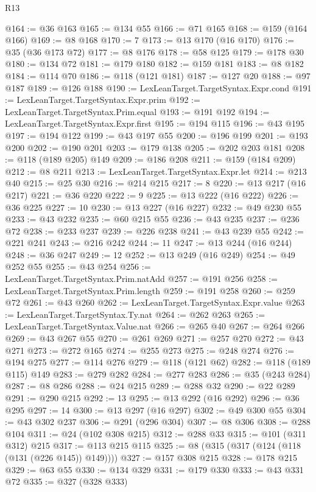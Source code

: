 \begin{lexlean}{R13}
\begin{coremodule}
@164 := @36 @163
@165 := @134 @55
@166 := @71 @165
@168 := @159 (@164 @166)
@169 := @8 @168
@170 := 7
@173 := @13 @170 (@16 @170)
@176 := @35 (@36 @173 @72)
@177 := @8 @176
@178 := @58 @125
@179 := @178 @30
@180 := @134 @72
@181 := @179 @180
@182 := @159 @181
@183 := @8 @182
@184 := @114 @70
@186 := @118 (@121 @181)
@187 := @127 @20
@188 := @97 @187
@189 := @126 @188
@190 := LexLeanTarget.TargetSyntax.Expr.cond
@191 := LexLeanTarget.TargetSyntax.Expr.prim
@192 := LexLeanTarget.TargetSyntax.Prim.equal
@193 := @191 @192
@194 := LexLeanTarget.TargetSyntax.Expr.first
@195 := @194 @115
@196 := @43 @195
@197 := @194 @122
@199 := @43 @197 @55
@200 := @196 @199
@201 := @193 @200
@202 := @190 @201
@203 := @179 @138
@205 := @202 @203 @181
@208 := @118 (@189 @205) @149
@209 := @186 @208
@211 := @159 (@184 @209)
@212 := @8 @211
@213 := LexLeanTarget.TargetSyntax.Expr.let
@214 := @213 @40
@215 := @25 @30
@216 := @214 @215
@217 := 8
@220 := @13 @217 (@16 @217)
@221 := @36 @220
@222 := 9
@225 := @13 @222 (@16 @222)
@226 := @36 @225
@227 := 10
@230 := @13 @227 (@16 @227)
@232 := @49 @230 @55
@233 := @43 @232
@235 := @60 @215 @55
@236 := @43 @235
@237 := @236 @72
@238 := @233 @237
@239 := @226 @238
@241 := @43 @239 @55
@242 := @221 @241
@243 := @216 @242
@244 := 11
@247 := @13 @244 (@16 @244)
@248 := @36 @247
@249 := 12
@252 := @13 @249 (@16 @249)
@254 := @49 @252 @55
@255 := @43 @254
@256 := LexLeanTarget.TargetSyntax.Prim.natAdd
@257 := @191 @256
@258 := LexLeanTarget.TargetSyntax.Prim.length
@259 := @191 @258
@260 := @259 @72
@261 := @43 @260
@262 := LexLeanTarget.TargetSyntax.Expr.value
@263 := LexLeanTarget.TargetSyntax.Ty.nat
@264 := @262 @263
@265 := LexLeanTarget.TargetSyntax.Value.nat
@266 := @265 @40
@267 := @264 @266
@269 := @43 @267 @55
@270 := @261 @269
@271 := @257 @270
@272 := @43 @271
@273 := @272 @165
@274 := @255 @273
@275 := @248 @274
@276 := @194 @275
@277 := @114 @276
@279 := @118 (@121 @62)
@282 := @118 (@189 @115) @149
@283 := @279 @282
@284 := @277 @283
@286 := @35 (@243 @284)
@287 := @8 @286
@288 := @24 @215
@289 := @288 @32
@290 := @22 @289
@291 := @290 @215
@292 := 13
@295 := @13 @292 (@16 @292)
@296 := @36 @295
@297 := 14
@300 := @13 @297 (@16 @297)
@302 := @49 @300 @55
@304 := @43 @302 @237
@306 := @291 (@296 @304)
@307 := @8 @306
@308 := @288 @104
@311 := @24 (@102 @308 @215)
@312 := @288 @33
@315 := @101 (@311 @312) @215
@317 := @113 @215 @115
@325 := @8 (@315 (@317 (@124 (@118 (@131 (@226 @145)) @149))))
@327 := @157 @308 @215
@328 := @178 @215
@329 := @63 @55
@330 := @134 @329
@331 := @179 @330
@333 := @43 @331 @72
@335 := @327 (@328 @333)

\end{coremodule}
\end{lexlean}
